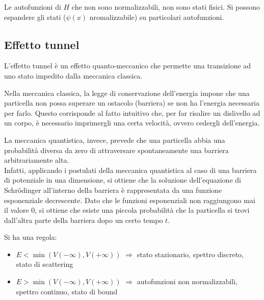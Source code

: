 Le autofunzioni di $H$ che non sono normalizzabili, non sono stati fisici. Si possono espandere gli stati ($\psi \left(x\right)$ nromalizzabile) su particolari autofunzioni.

\subsection{Effetto tunnel} %
L'effetto tunnel è un effetto quanto-meccanico che permette una transizione ad uno stato impedito dalla meccanica classica.

Nella meccanica classica, la legge di conservazione dell'energia impone che una particella non possa superare un ostacolo (barriera) se non ha l'energia necessaria per farlo. Questo corrisponde al fatto intuitivo che, per far risalire un dislivello ad un corpo, è necessario imprimergli una certa velocità, ovvero cedergli dell'energia.

La meccanica quantistica, invece, prevede che una particella abbia una probabilità diversa da zero di attraversare spontaneamente una barriera arbitrariamente alta.\\
Infatti, applicando i postulati della meccanica quantistica al caso di una barriera di potenziale in una dimensione, si ottiene che la soluzione dell'equazione di Schrödinger all'interno della barriera è rappresentata da una funzione esponenziale decrescente. Dato che le funzioni esponenziali non raggiungono mai il valore $0$, si ottiene che esiste una piccola probabilità che la particella si trovi dall'altra parte della barriera dopo un certo tempo $t$.

Si ha una regola:
\begin{itemize}
\item $E<\min{\left(V\left(-\infty \right),V\left(+\infty \right)\right)}$ $\Longrightarrow $ stato stazionario, spettro discreto, stato di scattering
\item $E>\min{\left(V\left(-\infty \right),V\left(+\infty \right)\right)}$ $\Longrightarrow $ autofunzioni non normalizzabili, spettro continuo, stato di bound
\end{itemize}